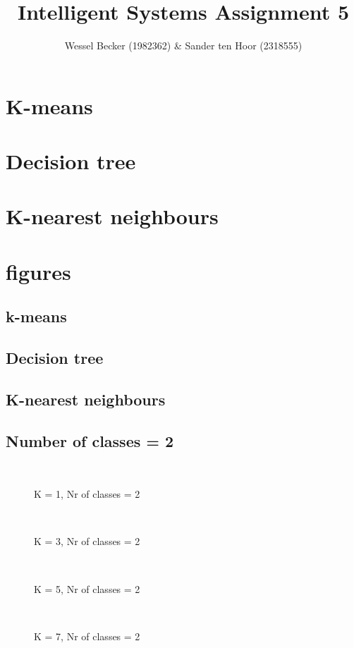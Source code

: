 \documentclass[10pt,a4paper]{article}
\begin{document}
\title{Intelligent Systems Assignment 5}
\author{Wessel Becker (1982362) \& Sander ten Hoor (2318555)}
\maketitle

\newcommand{\simplefigure}[3]{
	\begin{figure}[H]
  	\centering
    	\makebox[\textwidth]
    	{
    		\texttt{[image: \#1]}
 		} \\
  		\caption{#2}
  		\label{#3}
	\end{figure}
}
\newcommand{\mcode}[1]{
	
}

\section{K-means}
\section{Decision tree}
\section{K-nearest neighbours}


\appendix
\section{figures}
\subsection{k-means}
\subsection{Decision tree}
\subsection{K-nearest neighbours}
\subsection{Number of classes = 2}
\simplefigure{./matlab/img/3_1_2.png}{K = 1, Nr of classes = 2}{fig:3_1_2}
\simplefigure{./matlab/img/3_3_2.png}{K = 3, Nr of classes = 2}{fig:3_1_2}
\simplefigure{./matlab/img/3_5_2.png}{K = 5, Nr of classes = 2}{fig:3_1_2}
\simplefigure{./matlab/img/3_7_2.png}{K = 7, Nr of classes = 2}{fig:3_1_2}
\end{document}
